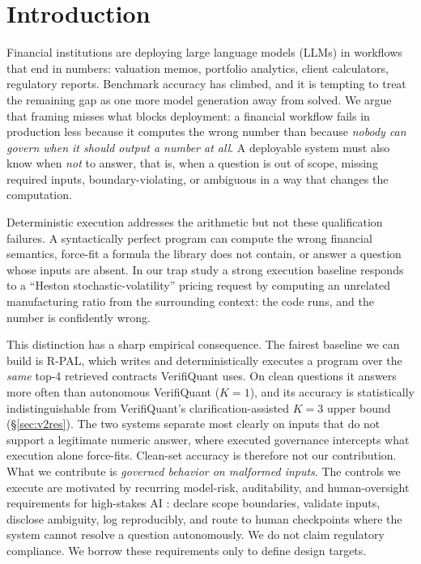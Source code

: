 \documentclass[sigconf,anonymous]{acmart}
\begin{document}
\section{Introduction}
Financial institutions are deploying large language models (LLMs) in workflows that end in numbers: valuation memos, portfolio analytics, client calculators, regulatory reports.
Benchmark accuracy has climbed, and it is tempting to treat the remaining gap as one more model generation away from solved.
We argue that framing misses what blocks deployment: a financial workflow fails in production less because it computes the wrong number than because \emph{nobody can govern when it should output a number at all}.
A deployable system must also know when \emph{not} to answer, that is, when a question is out of scope, missing required inputs, boundary-violating, or ambiguous in a way that changes the computation.

Deterministic execution addresses the arithmetic but not these qualification failures.
A syntactically perfect program can compute the wrong financial semantics, force-fit a formula the library does not contain, or answer a question whose inputs are absent.
In our trap study a strong execution baseline responds to a ``Heston stochastic-volatility'' pricing request by computing an unrelated manufacturing ratio from the surrounding context: the code runs, and the number is confidently wrong.

This distinction has a sharp empirical consequence.
The fairest baseline we can build is R-PAL, which writes and deterministically executes a program over the \emph{same} top-4 retrieved contracts VerifiQuant uses. On clean questions it answers more often than autonomous VerifiQuant ($K{=}1$), and its accuracy is statistically indistinguishable from VerifiQuant's clarification-assisted $K{=}3$ upper bound (\S\ref{sec:v2res}).
The two systems separate most clearly on inputs that do not support a legitimate numeric answer, where executed governance intercepts what execution alone force-fits.
Clean-set accuracy is therefore not our contribution. What we contribute is \emph{governed behavior on malformed inputs}. The controls we execute are motivated by recurring model-risk, auditability, and human-oversight requirements for high-stakes AI \cite{fed2011sr117,euaiact2024,finra2020ai}: declare scope boundaries, validate inputs, disclose ambiguity, log reproducibly, and route to human checkpoints where the system cannot resolve a question autonomously.
We do not claim regulatory compliance. We borrow these requirements only to define design targets.
\end{document}
